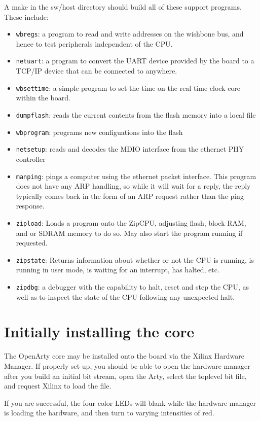\documentclass{gqtekspec}
\begin{document}
A make in the sw/host directory should build all of these support programs.
These include:
\begin{itemize}
\item {\tt wbregs}: a program to read and write addresses on the wishbone bus,
	and hence to test peripherals independent of the CPU.
\item {\tt netuart}: a program to convert the UART device provided by the board
	to a TCP/IP device that can be connected to anywhere.
\item {\tt wbsettime}: a simple program to set the time on the real-time clock
	core within the board.
\item {\tt dumpflash}: reads the current contents from the flash memory into a
 	local file
\item {\tt wbprogram}: programs new configuations into the flash
\item {\tt netsetup}: reads and decodes the MDIO interface from the ethernet
	PHY controller
\item {\tt manping}: pings a computer using the ethernet packet interface.
	This program does not have any ARP handling, so while it will wait
	for a reply, the reply typically comes back in the form of an ARP
	request rather than the ping response.
\item {\tt zipload}: Loads a program onto the ZipCPU, adjusting flash, block
	RAM, and or SDRAM memory to do so.  May also start the program running
	if requested.
\item {\tt zipstate}: Returns information about whether or not the CPU is
	running, is running in user mode, is waiting for an interrupt,
	has halted, etc.
\item {\tt zipdbg}: a debugger with the capability to halt, reset and step
	the CPU, as well as to inspect the state of the CPU following any
	unexpected halt.
\end{itemize}



\section{Initially installing the core}
The OpenArty core may be installed onto the board via the Xilinx Hardware
Manager.  If properly set up, you should be able to open the hardware 
manager after you build an initial bit stream, open the Arty, select the
toplevel bit file, and request Xilinx to load the file.

If you are successful, the four color LEDs will blank while the hardware
manager is loading the hardware, and then turn to varying intensities of red.
\end{document}

